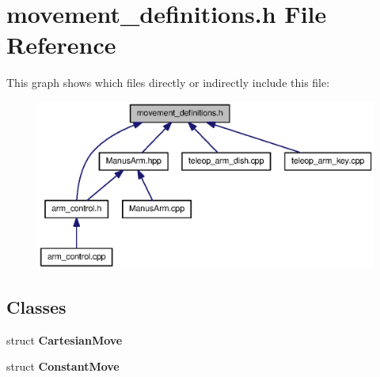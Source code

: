 \section{movement\-\_\-definitions.\-h \-File \-Reference}
\label{movement__definitions_8h}
\-This graph shows which files directly or indirectly include this file\-:\nopagebreak
\begin{figure}[H]
\begin{center}
\leavevmode
\includegraphics[width=350pt]{movement__definitions_8h__dep__incl}
\end{center}
\end{figure}
\subsection*{\-Classes}
\begin{DoxyCompactItemize}
\item 
struct {\bf \-Cartesian\-Move}
\item 
struct {\bf \-Constant\-Move}
\end{DoxyCompactItemize}
